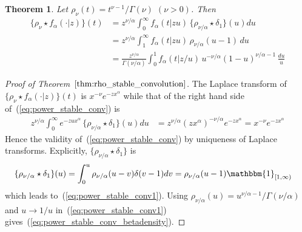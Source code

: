 \documentclass[a4paper,12pt]{article}
\newtheorem{theorem}{Theorem}
\begin{document}
{{\begin{theorem}
\label{thm:rho_stable_convolution}
Let  $\rho_\nu(t)=t^{\nu-1}/\Gamma(\nu)$ $(\nu>0)$. %
Then
\begin{align}
\{\rho_{\nu} \star f_\alpha(\cdot\vert z)\}(t)
&=   z^{\nu/\alpha} \int_0^\infty f_\alpha(t\vert z u)\, \{\rho_{\nu/\alpha} \star \delta_1\}(u) du 
\label{eq:power_stable_conv}  \\
&=   z^{\nu/\alpha} \int_1^\infty f_\alpha(t\vert z u)\, \rho_{\nu/\alpha} (u-1) \,  du 
\label{eq:power_stable_conv1}  \\
&=  \frac{z^{\nu/\alpha}}{\Gamma(\nu/\alpha)}
  \int_0^1 f_\alpha(t\vert z/u) \, u^{-\nu/\alpha}  (1-u)^{\nu/\alpha-1}  \, \frac{du}{u} 
  \label{eq:power_stable_conv_betadensity} 
\end{align}
\end{theorem}

\begin{proof}[Proof of Theorem~$\ref{thm:rho_stable_convolution}$]
\label{proof:rho_stable_convolution}
The Laplace  transform of   $\{\rho_{\nu} \star f_\alpha(\cdot\vert z)\}(t)$ is $x^{-\nu}e^{-zx^\alpha}$
while that of the right hand side of~(\ref{eq:power_stable_conv}) is
\begin{align*}
z^{\nu/\alpha} \int_0^\infty e^{-zu x^\alpha}  \, \{\rho_{\nu/\alpha} \star \delta_1\}(u) du 
&= z^{\nu/\alpha} (zx^\alpha)^{-\nu/\alpha} e^{-zx^\alpha} =  x^{-\nu} e^{-zx^\alpha}
\end{align*}
Hence the validity of~(\ref{eq:power_stable_conv}) by uniqueness of Laplace transforms.
Explicitly, $\{\rho_{\nu/\alpha} \star \delta_1\}$ is
\begin{align*}
\{\rho_{\nu/\alpha} \star \delta_1\}(u) &= \int_0^u \rho_{\nu/\alpha} (u-v) \delta(v-1) dv  
= \rho_{\nu/\alpha}(u-1) \mathbbm{1}_{[1,\infty)} 
\end{align*}
which leads to~(\ref{eq:power_stable_conv1}).
Using  $\rho_{\nu/\alpha}(u)=u^{\nu/\alpha-1}/\Gamma(\nu/\alpha)$ and  $u\to1/u$ in~(\ref{eq:power_stable_conv1})
gives~(\ref{eq:power_stable_conv_betadensity}).
 \end{proof}

}}
\end{document}
